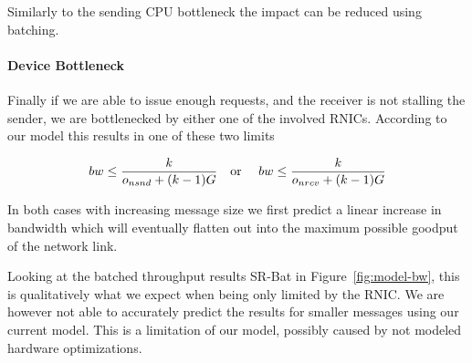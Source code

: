 Similarly to the sending CPU bottleneck the impact can be reduced using batching.


\paragraph{Device Bottleneck} Finally if we are able to issue enough requests, and the receiver is not stalling the sender,
we are bottlenecked by either one of the involved RNICs. According to our model this results in one of these two limits

$$
bw \leq \frac{k}{o_{nsnd} + (k-1)G} \text{\quad or \quad} bw \leq \frac{k}{o_{nrcv} + (k-1)G}
$$

In both cases with increasing message size we first predict a linear increase in bandwidth which will eventually 
flatten out into the maximum possible goodput of the network link.

Looking at the batched throughput results SR-Bat in Figure~\ref{fig:model-bw}, this is qualitatively what we expect 
when being only limited by the RNIC. We are however not able to accurately predict the results for smaller messages 
using our current model. This is a limitation of our model,  possibly caused by not modeled hardware optimizations.
